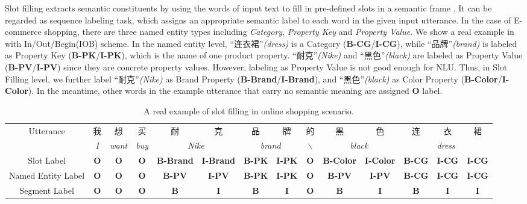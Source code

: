 Slot filling extracts semantic constituents
by using the words of input text to fill in pre-defined slots in 
a semantic frame \cite{mesnil2015using}.
It can be regarded as sequence labeling task,
which assigns an appropriate semantic label to each word in
the given input utterance. 
In the case of E-commerce shopping, 
there are three named entity types including 
\emph{Category}, \emph{Property Key} and \emph{Property Value}.
We show a real example in 
with In/Out/Begin(IOB) scheme.
In the named entity level,
``连衣裙''\emph{(dress)} is a Category (\textbf{B-CG}/\textbf{I-CG}),
while ``品牌''\emph{(brand)} is labeled as Property Key
(\textbf{B-PK}/\textbf{I-PK}),
which is the name of one product property.
``耐克''\emph{(Nike)} and ``黑色''\emph{(black)} are labeled as Property Value
(\textbf{B-PV}/\textbf{I-PV}) since they are concrete property values.
However, labeling as Property Value is not good enough for NLU.
Thus, in Slot Filling level, 
we further label ``耐克''\emph{(Nike)} as Brand Property (\textbf{B-Brand}/\textbf{I-Brand}), 
and ``黑色''\emph{(black)} as 
Color Property (\textbf{B-Color}/\textbf{I-Color}).
In the meantime, 
other words in the example utterance that carry no semantic meaning are assigned \textbf{O} label.
\begin{table*}[h]
	\centering
	\scriptsize
	\begin{tabular}{c|c|c|c|c|c|c|c|c|c|c|c|c|c}
		\toprule
		\multirow{2}{*}{Utterance} & 我 & 想 & 买 & 耐 & 克 & 品 & 牌 & 的 & 黑 & 色 & 连 & 衣 & 裙 \\
		\cmidrule{2-14}
		& \em{I} & \em{want} & \em{buy} & \multicolumn{2}{c|}{\em{Nike}} & \multicolumn{2}{c|}{\em{brand}} & $\backslash$  & \multicolumn{2}{c|}{\em{black}} & \multicolumn{3}{c}{\em{dress}} \\
		\midrule
		Slot Label & \textbf{O} & \textbf{O} & \textbf{O} & \textbf{B-Brand} & \textbf{I-Brand} & \textbf{B-PK} & \textbf{I-PK} & \textbf{O} & \textbf{B-Color} & \textbf{I-Color} & \textbf{B-CG} & \textbf{I-CG} & \textbf{I-CG} \\
		\midrule
		Named Entity Label & \textbf{O} & \textbf{O} & \textbf{O} & \textbf{B-PV} & \textbf{I-PV} & \textbf{B-PK} & \textbf{I-PK} & \textbf{O} & \textbf{B-PV} & \textbf{I-PV} & \textbf{B-CG} & \textbf{I-CG} & \textbf{I-CG} \\
		\midrule
		Segment Label & \textbf{O} & \textbf{O} & \textbf{O} & \textbf{B} & \textbf{I} & \textbf{B} & \textbf{I} & \textbf{O} & \textbf{B} & \textbf{I} & \textbf{B} & \textbf{I} & \textbf{I} \\
		\bottomrule
	\end{tabular}
	\caption{A real example of slot filling in online shopping scenario.}
	\label{tab:slot-filling-demo}
	\vspace{-10pt}
\end{table*}

